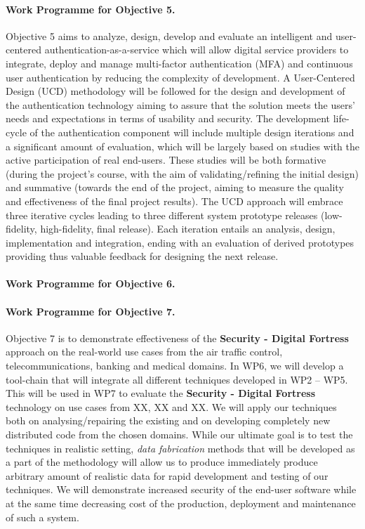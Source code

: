 \documentclass[a4paper,11pt]{article}
\newcommand{\project}[1]{\textbf{#1}\xspace}
\newcommand{\SECURITY}{\project{Security - Digital Fortress}}
\newcommand{\TheProject}{\SECURITY}
\begin{document}
\paragraph{Work Programme for Objective 5.}

Objective 5 aims to analyze, design, develop and evaluate an intelligent and user-centered authentication-as-a-service which will allow digital service providers to integrate, deploy and manage multi-factor authentication (MFA) and continuous user authentication by reducing the complexity of development. A User-Centered Design (UCD) methodology will be followed for the design and development of the authentication technology aiming to assure that the solution meets the users' needs and expectations in terms of usability and security. The development life-cycle of the authentication component will include multiple design iterations and a significant amount of evaluation, which will be largely based on studies with the active participation of real end-users. These studies will be both formative (during the project’s course, with the aim of validating/refining the initial design) and summative (towards the end of the project, aiming to measure the quality and effectiveness of the final project results). The UCD approach will embrace three iterative cycles leading to three different system prototype releases (low-fidelity, high-fidelity, final release). Each iteration entails an analysis, design, implementation and integration, ending with an evaluation of derived prototypes providing thus valuable feedback for designing the next release. 

\paragraph{Work Programme for Objective 6.}

\paragraph{Work Programme for Objective 7.} 

Objective 7 is to demonstrate effectiveness of the \TheProject{} approach on the real-world use cases from the air traffic control, telecommunications, banking and medical domains. In WP6, we will develop a tool-chain that will integrate all different techniques developed in WP2 -- WP5. This will be used in WP7 to evaluate the \TheProject{} technology  on use cases from XX, XX and XX. We will apply our techniques both on analysing/repairing the existing and on developing completely new distributed code from the chosen domains. While our ultimate goal is to test the techniques in realistic setting, \emph{data fabrication} methods that will be developed as a part of the methodology will allow us to produce immediately produce arbitrary amount of realistic data for rapid development and testing of our techniques. We will demonstrate increased security of the end-user software while at the same time decreasing cost of the production, deployment and maintenance of such a system.
\end{document}

